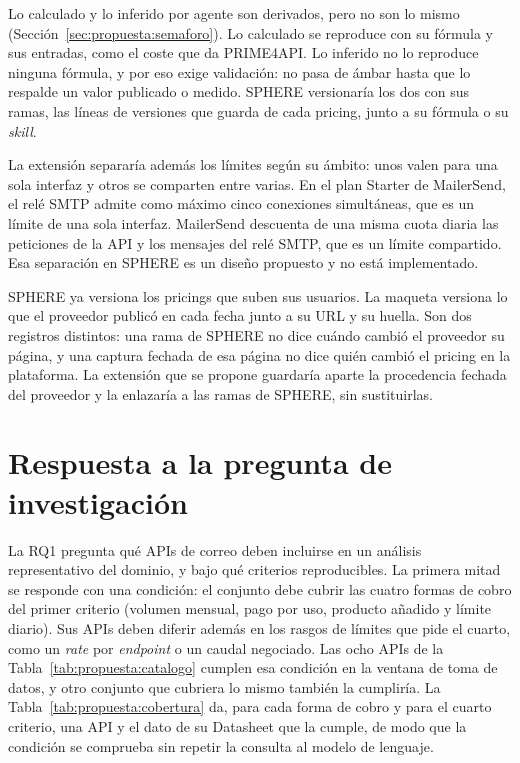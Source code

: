 Lo calculado y lo inferido por agente son derivados, pero no son lo mismo (Sección~\ref{sec:propuesta:semaforo}).
Lo calculado se reproduce con su fórmula y sus entradas, como el coste que da PRIME4API.
Lo inferido no lo reproduce ninguna fórmula, y por eso exige validación: no pasa de ámbar hasta que lo respalde un valor publicado o medido.
SPHERE versionaría los dos con sus ramas, las líneas de versiones que guarda de cada pricing, junto a su fórmula o su \textit{skill}.

La extensión separaría además los límites según su ámbito: unos valen para una sola interfaz y otros se comparten entre varias.
En el plan Starter de MailerSend, el relé SMTP admite como máximo cinco conexiones simultáneas, que es un límite de una sola interfaz.
MailerSend descuenta de una misma cuota diaria las peticiones de la API y los mensajes del relé SMTP, que es un límite compartido.
Esa separación en SPHERE es un diseño propuesto y no está implementado.

SPHERE ya versiona los pricings que suben sus usuarios.
La maqueta versiona lo que el proveedor publicó en cada fecha junto a su URL y su huella.
Son dos registros distintos: una rama de SPHERE no dice cuándo cambió el proveedor su página, y una captura fechada de esa página no dice quién cambió el pricing en la plataforma.
La extensión que se propone guardaría aparte la procedencia fechada del proveedor y la enlazaría a las ramas de SPHERE, sin sustituirlas.

\section{Respuesta a la pregunta de investigación}
\label{sec:propuesta:respuesta}

La RQ1 pregunta qué APIs de correo deben incluirse en un análisis representativo del dominio, y bajo qué criterios reproducibles.
La primera mitad se responde con una condición: el conjunto debe cubrir las cuatro formas de cobro del primer criterio (volumen mensual, pago por uso, producto añadido y límite diario).
Sus APIs deben diferir además en los rasgos de límites que pide el cuarto, como un \textit{rate} por \textit{endpoint} o un caudal negociado.
Las ocho APIs de la Tabla~\ref{tab:propuesta:catalogo} cumplen esa condición en la ventana de toma de datos, y otro conjunto que cubriera lo mismo también la cumpliría.
La Tabla~\ref{tab:propuesta:cobertura} da, para cada forma de cobro y para el cuarto criterio, una API y el dato de su Datasheet que la cumple, de modo que la condición se comprueba sin repetir la consulta al modelo de lenguaje.

